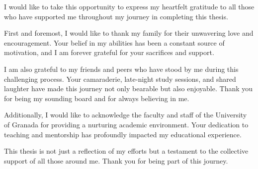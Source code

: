 I would like to take this opportunity to express my heartfelt gratitude to all those who have supported me throughout my journey in completing this thesis.

\textgap

First and foremost, I would like to thank my family for their unwavering love and encouragement. Your belief in my abilities has been a constant source of motivation, and I am forever grateful for your sacrifices and support.

\textgap

I am also grateful to my friends and peers who have stood by me during this challenging process. Your camaraderie, late-night study sessions, and shared laughter have made this journey not only bearable but also enjoyable. Thank you for being my sounding board and for always believing in me.

\textgap

Additionally, I would like to acknowledge the faculty and staff of the University of Granada for providing a nurturing academic environment. Your dedication to teaching and mentorship has profoundly impacted my educational experience.

\textgap

This thesis is not just a reflection of my efforts but a testament to the collective support of all those around me. Thank you for being part of this journey.

\clearpage
\mbox{}
\newpage
